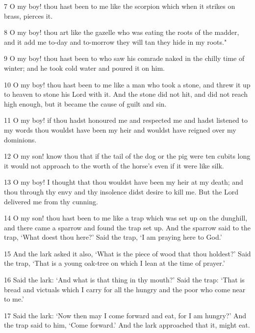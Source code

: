 \par 7 O my boy! thou hast been to me like the scorpion which when it strikes on brass, pierces it.

\par 8 O my boy! thou art like the gazelle who was eating the roots of the madder, and it add me to-day and to-morrow they will tan they hide in my roots."

\par 9 O my boy! thou hast been to who saw his comrade naked in the chilly time of winter; and he took cold water and poured it on him.

\par 10 O my boy! thou hast been to me like a man who took a stone, and threw it up to heaven to stone his Lord with it. And the stone did not hit, and did not reach high enough, but it became the cause of guilt and sin.

\par 11 O my boy! if thou hadst honoured me and respected me and hadst listened to my words thou wouldst have been my heir and wouldst have reigned over my dominions.

\par 12 O my son! know thou that if the tail of the dog or the pig were ten cubits long it would not approach to the worth of the horse's even if it were like silk.

\par 13 O my boy! I thought that thou wouldst have been my heir at my death; and thou through thy envy and thy insolence didst desire to kill me. But the Lord delivered me from thy cunning.

\par 14 O my son! thou hast been to me like a trap which was set up on the dunghill, and there came a sparrow and found the trap set up. And the sparrow said to the trap, ‘What doest thou here?’ Said the trap, ‘I am praying here to God.’

\par 15 And the lark asked it also, ‘What is the piece of wood that thou holdest?’ Said the trap, ‘That is a young oak-tree on which I lean at the time of prayer.’

\par 16 Said the lark: ‘And what is that thing in thy mouth?’ Said the trap: ‘That is bread and victuals which I carry for all the hungry and the poor who come near to me.’

\par 17 Said the lark: ‘Now then may I come forward and eat, for I am hungry?’ And the trap said to him, ‘Come forward.’ And the lark approached that it, might eat.

